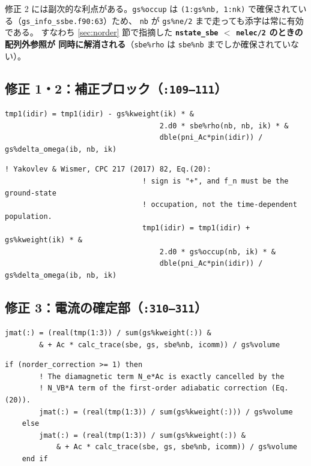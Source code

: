 \documentclass[dvipdfmx,a4paper,11pt]{jsarticle}
\newcommand{\file}[1]{\texttt{#1}}
\begin{document}
修正 2 には副次的な利点がある。\verb|gs%occup| は
\verb|(1:gs%nb, 1:nk)| で確保されている（\file{gs\_info\_ssbe.f90:63}）ため、
\verb|nb| が \verb|gs%ne/2| まで走っても添字は常に有効である。
すなわち \ref{sec:norder} 節で指摘した
\textbf{\file{nstate\_sbe} $<$ \file{nelec/2} のときの配列外参照が
同時に解消される}（\verb|sbe%rho| は \verb|sbe%nb| までしか確保されていない）。

\subsection{修正 1・2：補正ブロック（\file{:109--111}）}

\begin{lstlisting}[caption={修正前（\file{bloch\_solver\_ssbe.f90:109--111}）},firstnumber=109]
                                tmp1(idir) = tmp1(idir) - gs%kweight(ik) * &
                                    2.d0 * sbe%rho(nb, nb, ik) * &
                                    dble(pni_Ac*pin(idir)) / gs%delta_omega(ib, nb, ik)
\end{lstlisting}

\begin{lstlisting}[caption={修正後。変更は演算子 1 文字と参照配列 1 つのみ。},firstnumber=109]
                                ! Yakovlev & Wismer, CPC 217 (2017) 82, Eq.(20):
                                ! sign is "+", and f_n must be the ground-state
                                ! occupation, not the time-dependent population.
                                tmp1(idir) = tmp1(idir) + gs%kweight(ik) * &
                                    2.d0 * gs%occup(nb, ik) * &
                                    dble(pni_Ac*pin(idir)) / gs%delta_omega(ib, nb, ik)
\end{lstlisting}

\subsection{修正 3：電流の確定部（\file{:310--311}）}

\begin{lstlisting}[caption={修正前（\file{bloch\_solver\_ssbe.f90:310--311}）},firstnumber=310]
    jmat(:) = (real(tmp(1:3)) / sum(gs%kweight(:)) &
        & + Ac * calc_trace(sbe, gs, sbe%nb, icomm)) / gs%volume
\end{lstlisting}

\begin{lstlisting}[caption={修正後。反磁性項は 1 次補正によって相殺される。},firstnumber=310]
    if (norder_correction >= 1) then
        ! The diamagnetic term N_e*Ac is exactly cancelled by the
        ! N_VB*A term of the first-order adiabatic correction (Eq.(20)).
        jmat(:) = (real(tmp(1:3)) / sum(gs%kweight(:))) / gs%volume
    else
        jmat(:) = (real(tmp(1:3)) / sum(gs%kweight(:)) &
            & + Ac * calc_trace(sbe, gs, sbe%nb, icomm)) / gs%volume
    end if
\end{lstlisting}
\end{document}
